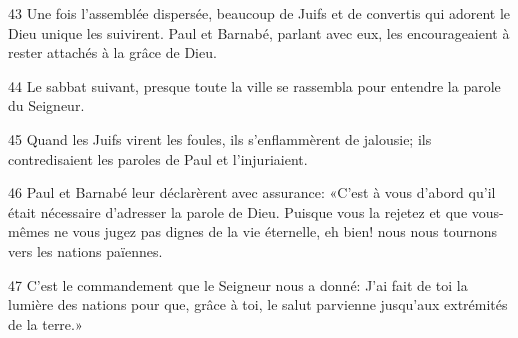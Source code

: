 43 Une fois l’assemblée dispersée, beaucoup de Juifs et de convertis qui adorent le Dieu unique les suivirent. Paul et Barnabé, parlant avec eux, les encourageaient à rester attachés à la grâce de Dieu.

44 Le sabbat suivant, presque toute la ville se rassembla pour entendre la parole du Seigneur.

45 Quand les Juifs virent les foules, ils s’enflammèrent de jalousie; ils contredisaient les paroles de Paul et l’injuriaient.

46 Paul et Barnabé leur déclarèrent avec assurance: «C’est à vous d’abord qu’il était nécessaire d’adresser la parole de Dieu. Puisque vous la rejetez et que vous-mêmes ne vous jugez pas dignes de la vie éternelle, eh bien! nous nous tournons vers les nations païennes.

47 C’est le commandement que le Seigneur nous a donné: J’ai fait de toi la lumière des nations pour que, grâce à toi, le salut parvienne jusqu’aux extrémités de la terre.»
